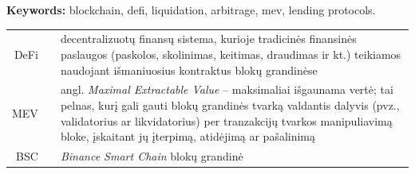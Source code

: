 \documentclass[]{VUMIFTemplateClass}
\begin{document}
\textbf{Keywords:} blockchain, defi, liquidation, arbitrage, mev, lending protocols.

\begin{tabular}{rcp{}}
    {DeFi} & {} & {decentralizuotų finansų sistema, kurioje tradicinės finansinės paslaugos (paskolos, skolinimas, keitimas, draudimas ir kt.) teikiamos naudojant išmaniuosius kontraktus blokų grandinėse} \\ 
    {MEV} & {} & {angl. \textit{Maximal Extractable Value} – maksimaliai išgaunama vertė; tai pelnas, kurį gali gauti blokų grandinės tvarką valdantis dalyvis (pvz., validatorius ar likvidatorius) per tranzakcijų tvarkos manipuliavimą bloke, įskaitant jų įterpimą, atidėjimą ar pašalinimą} \\ 
    {BSC} & {} & {\textit{Binance Smart Chain} blokų grandinė}
\end{tabular}


\end{document}
